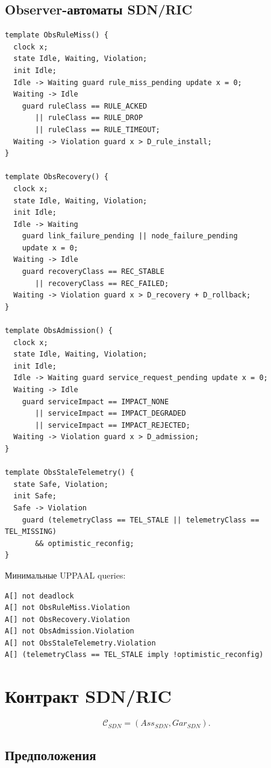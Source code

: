 \documentclass[10pt,a4paper]{article}
\newcommand{\Contract}[1]{\mathcal{C}_{#1}}
\begin{document}
\subsection{Observer-автоматы SDN/RIC}

\begin{verbatim}
template ObsRuleMiss() {
  clock x;
  state Idle, Waiting, Violation;
  init Idle;
  Idle -> Waiting guard rule_miss_pending update x = 0;
  Waiting -> Idle
    guard ruleClass == RULE_ACKED
       || ruleClass == RULE_DROP
       || ruleClass == RULE_TIMEOUT;
  Waiting -> Violation guard x > D_rule_install;
}

template ObsRecovery() {
  clock x;
  state Idle, Waiting, Violation;
  init Idle;
  Idle -> Waiting
    guard link_failure_pending || node_failure_pending
    update x = 0;
  Waiting -> Idle
    guard recoveryClass == REC_STABLE
       || recoveryClass == REC_FAILED;
  Waiting -> Violation guard x > D_recovery + D_rollback;
}

template ObsAdmission() {
  clock x;
  state Idle, Waiting, Violation;
  init Idle;
  Idle -> Waiting guard service_request_pending update x = 0;
  Waiting -> Idle
    guard serviceImpact == IMPACT_NONE
       || serviceImpact == IMPACT_DEGRADED
       || serviceImpact == IMPACT_REJECTED;
  Waiting -> Violation guard x > D_admission;
}

template ObsStaleTelemetry() {
  state Safe, Violation;
  init Safe;
  Safe -> Violation
    guard (telemetryClass == TEL_STALE || telemetryClass == TEL_MISSING)
       && optimistic_reconfig;
}
\end{verbatim}

Минимальные UPPAAL queries:
\begin{verbatim}
A[] not deadlock
A[] not ObsRuleMiss.Violation
A[] not ObsRecovery.Violation
A[] not ObsAdmission.Violation
A[] not ObsStaleTelemetry.Violation
A[] (telemetryClass == TEL_STALE imply !optimistic_reconfig)
\end{verbatim}

\section{Контракт SDN/RIC}

\[
\Contract{SDN}=(Ass_{SDN},Gar_{SDN}).
\]

\subsection{Предположения}
\end{document}
